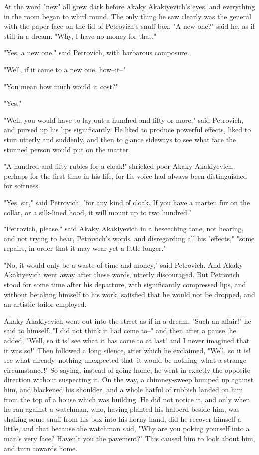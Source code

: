 At the word "new" all grew dark before Akaky Akakiyevich's eyes, and
everything in the room began to whirl round. The only thing he saw
clearly was the general with the paper face on the lid of Petrovich's
snuff-box. "A new one?" said he, as if still in a dream. "Why, I have
no money for that."

"Yes, a new one," said Petrovich, with barbarous composure.

"Well, if it came to a new one, how--it--"

"You mean how much would it cost?"

"Yes."

"Well, you would have to lay out a hundred and fifty or more," said
Petrovich, and pursed up his lips significantly. He liked to produce
powerful effects, liked to stun utterly and suddenly, and then to
glance sideways to see what face the stunned person would put on the
matter.

"A hundred and fifty rubles for a cloak!" shrieked poor Akaky
Akakiyevich, perhaps for the first time in his life, for his voice had
always been distinguished for softness.

"Yes, sir," said Petrovich, "for any kind of cloak. If you have a
marten fur on the collar, or a silk-lined hood, it will mount up to
two hundred."

"Petrovich, please," said Akaky Akakiyevich in a beseeching tone, not
hearing, and not trying to hear, Petrovich's words, and disregarding
all his "effects," "some repairs, in order that it may wear yet a
little longer."

"No, it would only be a waste of time and money," said Petrovich. And
Akaky Akakiyevich went away after these words, utterly discouraged.
But Petrovich stood for some time after his departure, with
significantly compressed lips, and without betaking himself to his
work, satisfied that he would not be dropped, and an artistic tailor
employed.

Akaky Akakiyevich went out into the street as if in a dream. "Such an
affair!" he said to himself. "I did not think it had come to--" and
then after a pause, he added, "Well, so it is! see what it has come to
at last! and I never imagined that it was so!" Then followed a long
silence, after which he exclaimed, "Well, so it is! see what
already--nothing unexpected that--it would be nothing--what a strange
circumstance!" So saying, instead of going home, he went in exactly
the opposite direction without suspecting it. On the way, a
chimney-sweep bumped up against him, and blackened his shoulder, and a
whole hatful of rubbish landed on him from the top of a house which
was building. He did not notice it, and only when he ran against a
watchman, who, having planted his halberd beside him, was shaking some
snuff from his box into his horny hand, did he recover himself a
little, and that because the watchman said, "Why are you poking
yourself into a man's very face? Haven't you the pavement?" This
caused him to look about him, and turn towards home.

